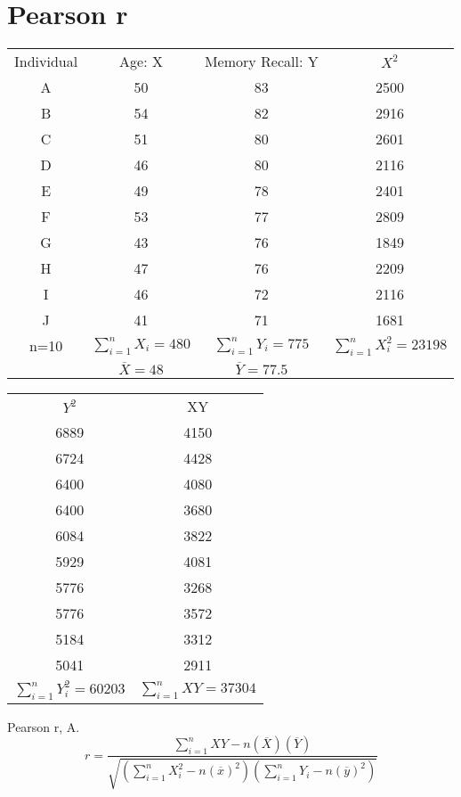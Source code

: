 \documentclass{article}
\begin{document}
     \section*{Pearson r}
    \begin{center}
    \begin{tabular}{cccc}
            Individual & Age: X & Memory Recall: Y  &$X^2$ \\
            A & 50 & 83 & 2500 \\ 
            B & 54 & 82 & 2916 \\ 
            C & 51 & 80 & 2601 \\ 
            D & 46 & 80 & 2116 \\ 
            E & 49 & 78 & 2401 \\ 
            F & 53 & 77 & 2809 \\ 
            G & 43 & 76 & 1849 \\ 
            H & 47 & 76 & 2209 \\ 
            I & 46 & 72 & 2116 \\ 
            J & 41 & 71 & 1681 \\ 
            n=10& $\sum_{i=1}^{n}X_i=480$ & $\sum_{i=1}^{n}Y_i=775$ & $\sum_{i=1}^{n}X^2_i=23198$ \\ 
            & $\overline{X}=48$ & $\overline{Y}=77.5$
    \end{tabular}
    \end{center}
    \begin{center}
        \begin{tabular}{cc}
             $Y^2$ & XY \\
            6889 & 4150\\
            6724 & 4428\\
            6400 & 4080\\
            6400 & 3680\\
            6084 & 3822\\
            5929 & 4081\\
            5776 & 3268\\
            5776 & 3572\\
            5184 & 3312\\
            5041 & 2911\\
            $\sum_{i=1}^{n}Y^2_i=60203$ & $\sum_{i=1}^{n}XY=37304$
        \end{tabular}
    \end{center}
    \par Pearson r, A.
    \begin{equation}
        r=\frac{\sum_{i=1}^{n}XY-n(\overline{X})(\overline{Y})}{\sqrt{(\sum_{i=
        1}^{n}X^2_i-n(\overline{x})^2)
        (\sum_{i=1}^{n}Y_i-n(\overline{y})^2)}}
    \end{equation}
\end{document}
